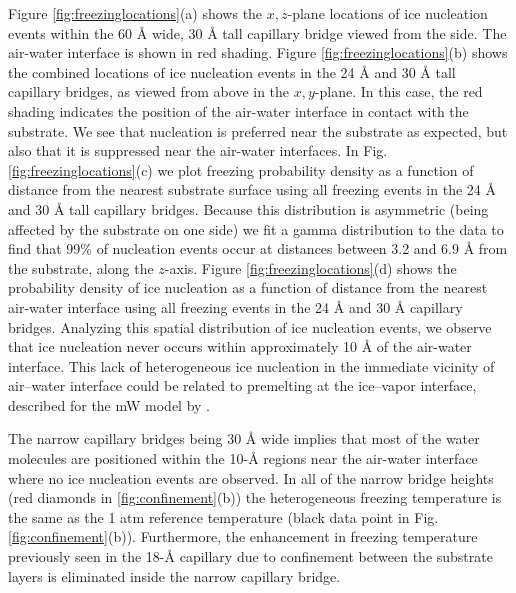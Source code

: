 \documentclass[journal abbreviation, manuscript]{copernicus}
\begin{document}
Figure \ref{fig:freezinglocations}(a) shows the $x,z$-plane locations of ice nucleation events within the 60 \AA{} wide, 30 \AA{} tall capillary bridge viewed from the side. The air-water interface is shown in red shading. Figure \ref{fig:freezinglocations}(b) shows the combined locations of ice nucleation events in the 24 \AA{} and 30 \AA{} tall capillary bridges, as viewed from above in the $x,y$-plane. In this case, the red shading indicates the position of the air-water interface in contact with the substrate. We see that nucleation is preferred near the substrate as expected, but also that it is suppressed near the air-water interfaces. In Fig. \ref{fig:freezinglocations}(c) we plot freezing probability density as a function of distance from the nearest substrate surface using all freezing events in the 24 \AA{} and 30 \AA{} tall capillary bridges. Because this distribution is asymmetric (being affected by the substrate on one side) we fit a gamma distribution to the data to find that 99\% of nucleation events occur at distances between 3.2 and 6.9 \AA{} from the substrate, along the $z$-axis. Figure \ref{fig:freezinglocations}(d) shows the probability density of ice nucleation as a function of distance from the nearest air-water interface using all freezing events in the 24 \AA{} and 30 \AA{} capillary bridges. Analyzing this spatial distribution of ice nucleation events, we observe that ice nucleation never occurs within approximately 10 \AA{} of the air-water interface. This lack of heterogeneous ice nucleation in the immediate vicinity of air--water interface could be related to premelting at the ice--vapor interface, described for the mW model by \citet{qiu2018premelting}.

The narrow capillary bridges being 30 \AA{} wide implies that most of the water molecules are positioned within the 10-\AA{} regions near the air-water interface where no ice nucleation events are observed. In all of the narrow bridge heights (red diamonds in \ref{fig:confinement}(b)) the heterogeneous freezing temperature is the same as the 1 atm reference temperature (black data point in Fig. \ref{fig:confinement}(b)). Furthermore, the enhancement in freezing temperature previously seen in the 18-\AA{} capillary due to confinement between the substrate layers is eliminated inside the narrow capillary bridge. 
\end{document}
